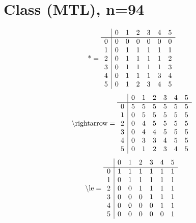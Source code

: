 \documentclass[11pt]{article}
\begin{document}
\section{Class (MTL), n=94}
\[\text{*} = 
\begin{array}{r | r r r r r r}
 & 0 & 1 & 2 & 3 & 4 & 5 \\ \hline
0 & 0 & 0 & 0 & 0 & 0 & 0 \\
1 & 0 & 1 & 1 & 1 & 1 & 1 \\
2 & 0 & 1 & 1 & 1 & 1 & 2 \\
3 & 0 & 1 & 1 & 1 & 1 & 3 \\
4 & 0 & 1 & 1 & 1 & 3 & 4 \\
5 & 0 & 1 & 2 & 3 & 4 & 5 \\
\end{array}
\]
\[\text{\textbackslash rightarrow} = 
\begin{array}{r | r r r r r r}
 & 0 & 1 & 2 & 3 & 4 & 5 \\ \hline
0 & 5 & 5 & 5 & 5 & 5 & 5 \\
1 & 0 & 5 & 5 & 5 & 5 & 5 \\
2 & 0 & 4 & 5 & 5 & 5 & 5 \\
3 & 0 & 4 & 4 & 5 & 5 & 5 \\
4 & 0 & 3 & 3 & 4 & 5 & 5 \\
5 & 0 & 1 & 2 & 3 & 4 & 5 \\
\end{array}
\]
\[\text{\textbackslash le} = 
\begin{array}{r | r r r r r r}
 & 0 & 1 & 2 & 3 & 4 & 5 \\ \hline
0 & 1 & 1 & 1 & 1 & 1 & 1 \\
1 & 0 & 1 & 1 & 1 & 1 & 1 \\
2 & 0 & 0 & 1 & 1 & 1 & 1 \\
3 & 0 & 0 & 0 & 1 & 1 & 1 \\
4 & 0 & 0 & 0 & 0 & 1 & 1 \\
5 & 0 & 0 & 0 & 0 & 0 & 1 \\
\end{array}
\]
\end{document}
